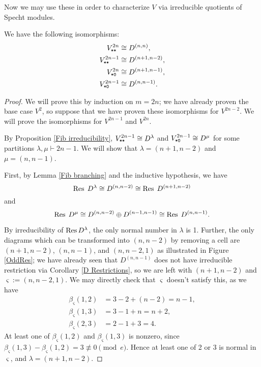 \documentclass{amsart}
\begin{document}
Now we may use these in order to characterize $V$ via irreducible quotients of Specht modules.
\begin{theorem}\label{Fibonacci Theorem}
  We have the following isomorphisms:
     \begin{align*}  
      V^{2n}_{\texttt{*}\texttt{*}} &\cong D^{(n,n)},\\ 
      V^{2n-1}_{\texttt{*}\texttt{*}} &\cong D^{(n+1,n-2)},\\
      V^{2n}_{\texttt{*}\texttt{0}} &\cong D^{(n+1,n-1)},\\
      V^{2n-1}_{\texttt{*}\texttt{0}} &\cong D^{(n,n-1)}.
     \end{align*}
\end{theorem}
\begin{proof}
  We will prove this by induction on $m = 2n$;
  we have already proven the base case $V^{2}$, so suppose that we have proven these isomorphisms for $V^{2n-2}$.
  We will prove the isomorphisms for $V^{2n-1}$ and $V^{2n}$.

  By Proposition \ref{Fib irreducibility}, $V^{2n-1}_{\texttt{*}\texttt{*}} \cong D^{\lambda}$ and $V^{2n-1}_{\texttt{*}\texttt{0}} \cong D^{\mu}$ for some partitions $\lambda,\mu \vdash 2n - 1$.
  We will show that $\lambda = (n+1,n-2)$ and $\mu = (n,n-1)$.
  
  First, by Lemma \ref{Fib branching} and the inductive hypothesis, we have \[\operatorname{Res} \; D^{\lambda} \cong D^{(n,n-2)} \cong \operatorname{Res} \; D^{(n+1,n-2)}\] and \[\operatorname{Res} \; D^{\mu} \cong D^{(n,n-2)} \oplus D^{(n-1,n-1)} \cong \operatorname{Res} \; D^{(n,n-1)}.\]
  
  By irreducibility of $\operatorname{Res} D^{\lambda}$, the only normal number in $\lambda$ is 1.\cite{Kleshchev,Brundan}
  Further, the only diagrams which can be transformed into $(n,n-2)$ by removing a cell are $(n+1,n-2)$, $(n,n-1)$, and $(n,n-2,1)$ as illustrated in Figure \ref{OddRes};
  we have already seen that $D^{(n,n-1)}$ does not have irreducible restriction via Corollary \ref{D Restrictions}, so we are left with $(n+1,n-2)$ and $\varsigma := (n,n-2,1)$.
  We may directly check that $\varsigma$ doesn't satisfy this, as we have
  \begin{align*} 
    \beta_\varsigma(1,2) &= 3 - 2 + (n-2) = n-1,\\
    \beta_\varsigma(1,3) &= 3 - 1 + n = n+2,\\
    \beta_\varsigma(2,3) &= 2 - 1 + 3 = 4.
   \end{align*} 
  At least one of $\beta_\varsigma(1,2)$ and $\beta_\varsigma(1,3)$ is nonzero, since $\beta_\varsigma(1,3) - \beta_\varsigma(1,2) = 3 \not\equiv 0 \pmod e$.
  Hence at least one of 2 or 3 is normal in $\varsigma$, and $\lambda = (n+1,n-2)$.


\end{proof}
\end{document}

